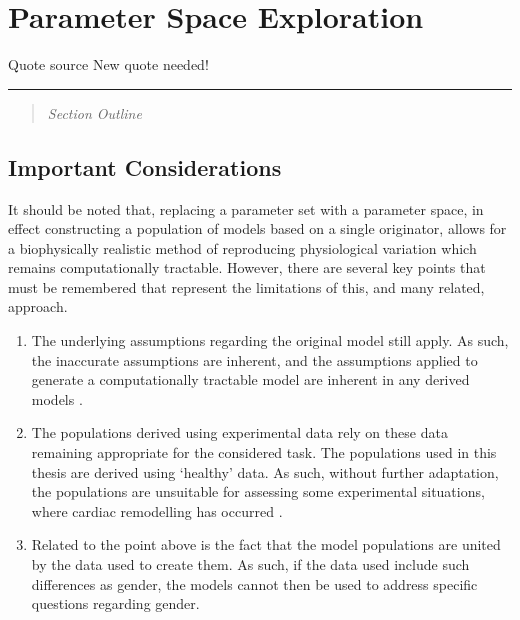 \documentclass[../thesis-main.tex]{subfiles}
\begin{document}
\chapter{Parameter Space Exploration}
\label{ch:paramSpace}

\begin{aquote}{Quote source}
  {\selectfont
   New quote needed!
  }
\end{aquote}
\rule{\linewidth}{0.25mm}

  \begin{quote}
   \emph{Section Outline}
  \end{quote}
  
 \section{Important Considerations}
 \label{sec:considerations}
 It should be noted that, replacing a parameter set with a parameter space, in effect constructing a population of models based on a single originator, allows for a biophysically realistic method of reproducing physiological variation which remains computationally tractable. However, there are several key points that must be remembered that represent the limitations of this, and many related, approach.
 \begin{enumerate}
  \item The underlying assumptions regarding the original model still apply. As such, the inaccurate assumptions are inherent, and the assumptions applied to generate a computationally tractable model are inherent in any derived models \citet{Noble2001, Quinn2013}.
  \item The populations derived using experimental data rely on these data remaining appropriate for the considered task. The populations used in this thesis are derived using `healthy' data. As such, without further adaptation, the populations are unsuitable for assessing some experimental situations, \eg{} where cardiac remodelling has occurred \citep{Walmsley2013}.
  \item Related to the point above is the fact that the model populations are united by the data used to create them. As such, if the data used include such differences as gender, the models cannot then be used to address specific questions regarding gender.
 \end{enumerate}
 
 
\end{document}

